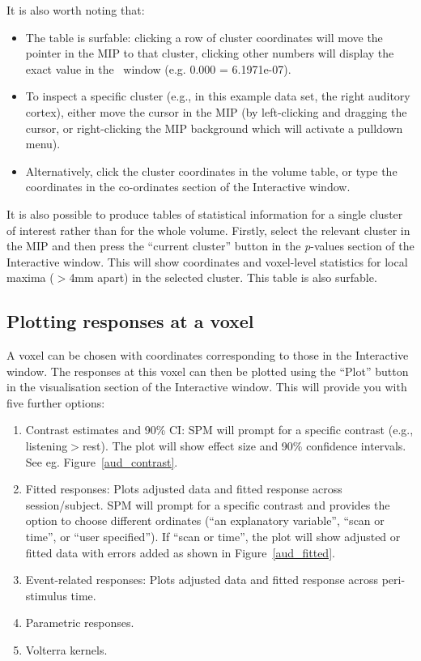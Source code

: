 It is also worth noting that:

\begin{itemize}
\item The table is surfable: clicking a row of cluster coordinates will move the pointer in the MIP to that cluster, clicking other numbers will display the exact value in the \matlab\ window (e.g. 0.000 = 6.1971e-07).
\item To inspect a specific cluster (e.g., in this example data set, the right auditory cortex), either move the cursor in the MIP (by left-clicking and dragging the cursor, or right-clicking the MIP background which will activate a pulldown menu).
\item Alternatively, click the cluster coordinates in the volume table, or type the coordinates in the co-ordinates section of the Interactive window.
\end{itemize}

It is also possible to produce tables of statistical information for a single cluster of interest rather than for the whole volume. Firstly, select the relevant cluster in the MIP and then press the ``current cluster'' button in the \textit{p}-values section of the Interactive window. This will show coordinates and voxel-level statistics for local maxima ($>$4mm apart) in the selected cluster. This table is also surfable.

\subsection{Plotting responses at a voxel}

A voxel can be chosen with coordinates corresponding to those in the Interactive window. The responses at this voxel can then be plotted using the ``Plot'' button in the visualisation section of the Interactive window. This will provide you with five further options:

\begin{enumerate}
\item Contrast estimates and 90\% CI: SPM will prompt for a specific contrast (e.g., listening$>$rest). The plot will show effect size and 90\% confidence intervals. See eg. Figure~\ref{aud_contrast}.
\item Fitted responses: Plots adjusted data and fitted response across session/subject. SPM will prompt for a specific contrast and provides the option to choose different ordinates (``an explanatory variable'', ``scan or time'', or ``user specified''). If ``scan or time'', the plot will show adjusted or fitted data with errors added as shown in Figure~\ref{aud_fitted}.
\item Event-related responses: Plots adjusted data and fitted response across peri-stimulus time.
\item Parametric responses.
\item Volterra kernels.
\end{enumerate}

